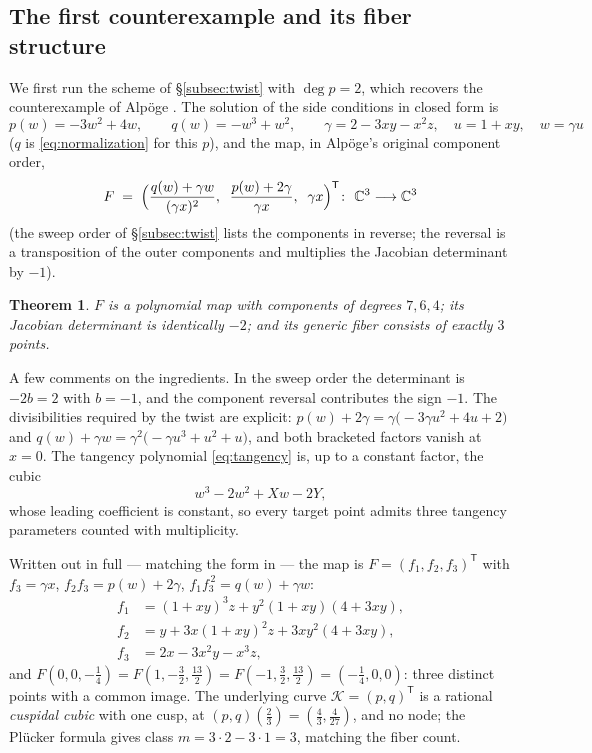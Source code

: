 \documentclass[11pt]{article}
\theoremstyle{plain}
\newtheorem{theorem}{Theorem}[section]
\theoremstyle{definition}
\theoremstyle{remark}
\newcommand{\C}{\mathbb{C}}
\begin{document}
\subsection{The first counterexample and its fiber structure}\label{sec:first}

We first run the scheme of \S\ref{subsec:twist} with $\deg p=2$, which recovers
the counterexample of Alp\"oge \cite{Alpoge2026}. The solution of the side
conditions in closed form is
\[
p(w)=-3w^2+4w,\qquad
q(w)=-w^3+w^2,\qquad
\gamma=2-3xy-x^2z,\quad u=1+xy,\quad w=\gamma u
\]
($q$ is \eqref{eq:normalization} for this $p$), and the map, in Alp\"oge's
original component order,
\[
F\;=\;\Bigl(\frac{q(w)+\gamma w}{(\gamma x)^2},\;\;
\frac{p(w)+2\gamma}{\gamma x},\;\;\gamma x\Bigr)^{\mathsf T}\colon\ \C^3\longrightarrow\C^3
\]
(the sweep order of \S\ref{subsec:twist} lists the components in reverse; the
reversal is a transposition of the outer components and multiplies the Jacobian
determinant by $-1$).

\begin{theorem}\label{thm:alpoge}
$F$ is a polynomial map with components of degrees $7,6,4$; its Jacobian
determinant is identically $-2$; and its generic fiber consists of exactly
$3$ points.
\end{theorem}

A few comments on the ingredients. In the sweep order the determinant is
$-2b=2$ with $b=-1$, and the component reversal contributes the sign $-1$.
The divisibilities required by the twist are explicit:
$p(w)+2\gamma=\gamma\bigl(-3\gamma u^2+4u+2\bigr)$ and
$q(w)+\gamma w=\gamma^2\bigl(-\gamma u^3+u^2+u\bigr)$, and both bracketed
factors vanish at $x=0$. The tangency
polynomial \eqref{eq:tangency} is, up to a constant factor, the cubic
\[
w^3-2w^2+Xw-2Y ,
\]
whose leading coefficient is constant, so every target point admits three
tangency parameters counted with multiplicity.

Written out in full --- matching the form in \cite{Speyer2026,Tao2026} --- the
map is $F=(f_1,f_2,f_3)^{\mathsf T}$ with $f_3=\gamma x$,
$f_2f_3=p(w)+2\gamma$, $f_1f_3^{\,2}=q(w)+\gamma w$:
\begin{align*}
f_1 &= (1+xy)^3 z + y^2(1+xy)(4+3xy),\\
f_2 &= y + 3x(1+xy)^2 z + 3xy^2(4+3xy),\\
f_3 &= 2x - 3x^2y - x^3 z ,
\end{align*}
and
$F(0,0,-\tfrac14)=F(1,-\tfrac32,\tfrac{13}{2})=F(-1,\tfrac32,\tfrac{13}{2})
=(-\tfrac14,0,0)$: three distinct points with a common image. The underlying
curve $\mathcal{K}=(p,q)^{\mathsf T}$ is a rational \emph{cuspidal cubic} with one cusp, at
$(p,q)(\tfrac23)=(\tfrac43,\tfrac4{27})$, and no node; the Pl\"ucker formula
gives class $m=3\cdot2-3\cdot1=3$, matching the fiber count.
\end{document}
